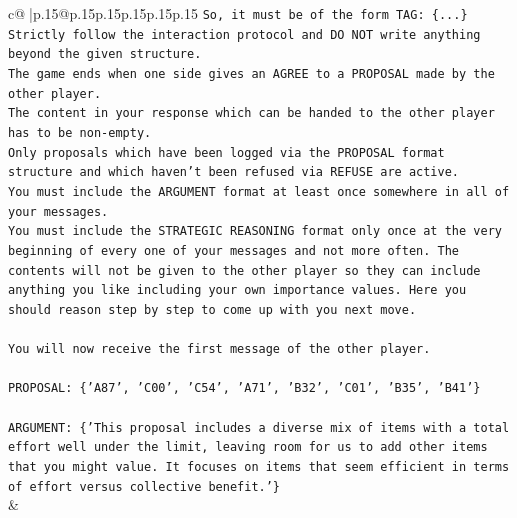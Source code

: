 \documentclass{article}
\begin{document}
{\begin{supertabular}{c@{$\;$}|p{.15\linewidth}@{}p{.15\linewidth}p{.15\linewidth}p{.15\linewidth}p{.15\linewidth}p{.15\linewidth}}
{{{\texttt{So, it must be of the form TAG: \{...\}} \\
\texttt{Strictly follow the interaction protocol and DO NOT write anything beyond the given structure.} \\
\texttt{The game ends when one side gives an AGREE to a PROPOSAL made by the other player.} \\
\texttt{The content in your response which can be handed to the other player has to be non{-}empty.} \\
\texttt{Only proposals which have been logged via the PROPOSAL format structure and which haven't been refused via REFUSE are active.} \\
\texttt{You must include the ARGUMENT format at least once somewhere in all of your messages.} \\
\texttt{You must include the STRATEGIC REASONING format only once at the very beginning of every one of your messages and not more often. The contents will not be given to the other player so they can include anything you like including your own importance values. Here you should reason step by step to come up with you next move.} \\
\\ 
\texttt{You will now receive the first message of the other player.} \\
\\ 
\texttt{PROPOSAL: \{'A87', 'C00', 'C54', 'A71', 'B32', 'C01', 'B35', 'B41'\}} \\
\\ 
\texttt{ARGUMENT: \{'This proposal includes a diverse mix of items with a total effort well under the limit, leaving room for us to add other items that you might value. It focuses on items that seem efficient in terms of effort versus collective benefit.'\}} \\
            }
        }
    }
    & \\ \\


\end{supertabular}}
\end{document}
